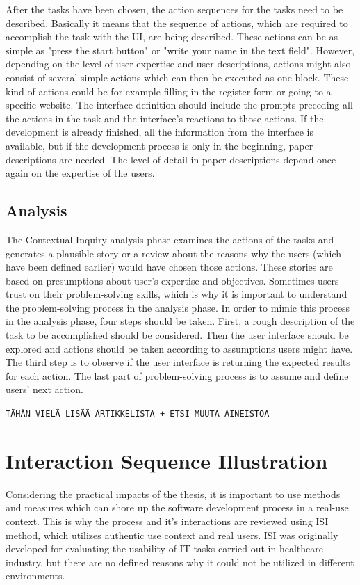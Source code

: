 \documentclass[12pt,a4paper,oneside,pdftex]{report}
\begin{document}
After the tasks have been chosen,  the action sequences for the tasks need to be described. Basically it means that the sequence of actions, which are required to accomplish the task with the UI, are being described. These actions can be as simple as "press the start button" or "write your name in the text field". However, depending on the level of user expertise and user descriptions, actions might also consist of several simple actions which can then be executed as one block. These kind of actions could be for example filling in the register form or going to a specific website. The interface definition should include the prompts preceding all the actions in the task and the interface's reactions to those actions. If the development is already finished, all the information from the interface is available, but if the development process is only in the beginning, paper descriptions are needed. The level of detail in paper descriptions depend once again on the expertise of the users. \cite{RefWorks:26}

\subsection{Analysis}

The Contextual Inquiry analysis phase examines the actions of the tasks and generates a plausible story or a review about the reasons why the users (which have been defined earlier) would have chosen those actions. These stories are based on presumptions about user's expertise and objectives. Sometimes users trust on their problem-solving skills, which is why it is important to understand the problem-solving process in the analysis phase. In order to mimic this process in the analysis phase, four steps should be taken. First, a rough description of the task to be accomplished should be considered. Then the user interface should be explored and actions should be taken according to assumptions users might have. The third step is to observe if the user interface is returning the expected results for each action. The last part of problem-solving process is to assume and define users' next action.\cite{RefWorks:26}

\texttt{TÄHÄN VIELÄ LISÄÄ ARTIKKELISTA + ETSI MUUTA AINEISTOA}

\section{Interaction Sequence Illustration}
\label{sec:isi}
Considering the practical impacts of the thesis, it is important to use methods and measures which can shore up the software development process in a real-use context. This is why the process and it's interactions are reviewed using ISI method, which utilizes 				authentic use context and real users. \cite{RefWorks:17} ISI was originally developed for evaluating the usability of IT tasks carried out in healthcare industry, but there are no defined reasons why it could not be utilized in different environments.
\end{document}
